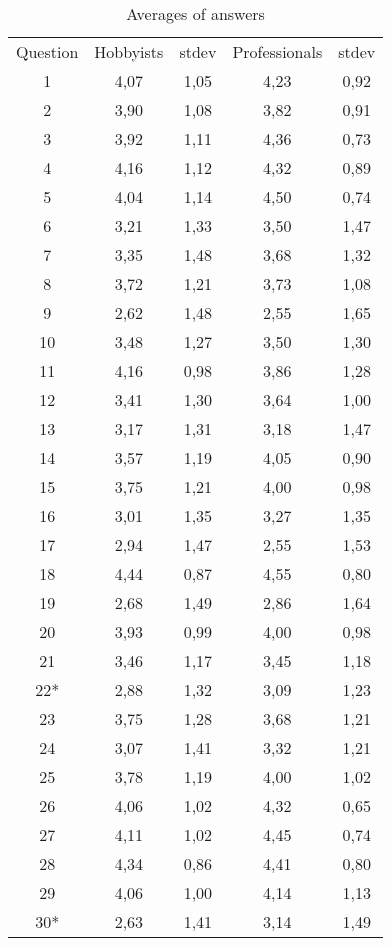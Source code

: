 \begin{table}
    \centering
        \caption{Averages of answers}
    \begin{tabular}{c|c c|c c}
        Question & Hobbyists & stdev & Professionals & stdev\\
        1 & 4,07 & 1,05 & 4,23 & 0,92\\
        2 & 3,90 & 1,08 & 3,82 & 0,91\\
        3 & 3,92 & 1,11 & 4,36 & 0,73\\
        4 & 4,16 & 1,12 & 4,32 & 0,89\\
        5 & 4,04& 1,14 & 4,50 & 0,74\\
        6 & 3,21& 1,33 & 3,50 & 1,47\\
        7 & 3,35& 1,48 & 3,68 & 1,32\\
        8 & 3,72& 1,21 & 3,73 & 1,08\\
        9 & 2,62& 1,48 & 2,55 & 1,65\\
        10 & 3,48& 1,27 & 3,50 & 1,30\\
        11 & 4,16& 0,98 & 3,86 & 1,28\\
        12 & 3,41& 1,30 & 3,64 & 1,00\\
        13 & 3,17& 1,31 & 3,18 & 1,47\\
        14 & 3,57& 1,19 & 4,05 & 0,90\\
        15 & 3,75& 1,21 & 4,00 & 0,98\\
        16 & 3,01& 1,35 & 3,27 & 1,35\\
        17 & 2,94& 1,47 & 2,55 & 1,53\\
        18 & 4,44& 0,87 & 4,55 & 0,80\\
        19 & 2,68& 1,49 & 2,86 & 1,64\\
        20 & 3,93& 0,99 & 4,00 & 0,98\\
        21 & 3,46& 1,17 & 3,45 & 1,18\\
        22* & 2,88& 1,32 & 3,09 & 1,23\\
        23 & 3,75& 1,28 & 3,68 & 1,21\\
        24 & 3,07& 1,41 & 3,32 & 1,21\\
        25 & 3,78& 1,19 & 4,00 & 1,02\\
        26 & 4,06& 1,02 & 4,32 & 0,65\\
        27 & 4,11& 1,02 & 4,45 & 0,74\\
        28 & 4,34& 0,86 & 4,41 & 0,80\\
        29 & 4,06& 1,00 & 4,14 & 1,13\\
        30* & 2,63& 1,41 & 3,14 & 1,49\\

\end{tabular}
\end{table}
